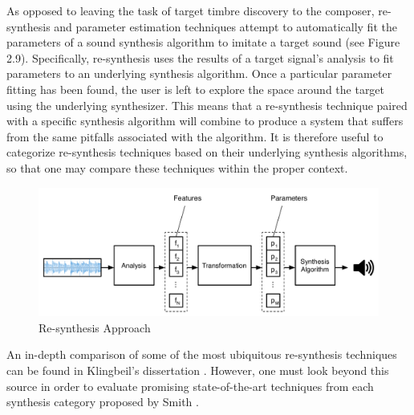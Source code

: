 \documentclass[a4paper,12pt]{report} 	%
\numberwithin{figure}{chapter}
\numberwithin{table}{chapter}
\numberwithin{equation}{chapter}
\begin{document}
\begin{flushleft}
As opposed to leaving the task of target timbre discovery to the composer, re-synthesis and parameter estimation techniques attempt to automatically fit the parameters of a sound synthesis algorithm to imitate a target sound (see Figure 2.9). Specifically, re-synthesis uses the results of a target signal's analysis to fit parameters to an underlying synthesis algorithm. Once a particular parameter fitting has been found, the user is left to explore the space around the target using the underlying synthesizer. This means that a re-synthesis technique paired with a specific synthesis algorithm will combine to produce a system that suffers from the same pitfalls associated with the algorithm. It is therefore useful to categorize re-synthesis techniques based on their underlying synthesis algorithms, so that one may compare these techniques within the proper context.
\\
\begin{figure}[h!]
\begin{center}
\includegraphics[scale=0.5]{ResynthesisIdea}
\caption[Re-synthesis]{Re-synthesis Approach}
\end{center}
\end{figure}
An in-depth comparison of some of the most ubiquitous re-synthesis techniques can be found in Klingbeil's dissertation \cite{Klingbeil:2009lo}. However, one must look beyond this source in order to evaluate promising state-of-the-art techniques from each synthesis category proposed by Smith \cite{III:1991hc}.


\end{flushleft}
\end{document}

